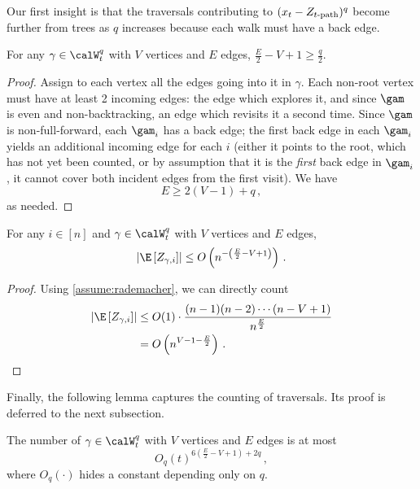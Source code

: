 \documentclass[12pt]{article}
\begin{document}
Our first insight is that the traversals contributing to $(x_t-Z_{t\textnormal{-path}})^q$ become further from trees as $q$ increases because each walk must have a back edge.

\begin{lemma}
    For any $\gamma\in \calW_t^q$ with $V$ vertices and $E$ edges, $\frac E 2 - V + 1\ge \frac q 2$.
\end{lemma}

\begin{proof}
    Assign to each vertex all the edges going into it in $\gamma$.
    Each non-root vertex must have at least 2 incoming edges:
    the edge which explores it, and since $\gam$ is even and non-backtracking,
    an edge which revisits it a second time.
    Since $\gam$ is non-full-forward, each $\gam_i$ has a back edge; the first back edge in each $\gam_i$ yields an additional incoming edge for each $i$ (either it points to the root, which has not yet been counted, or by assumption that it is the \emph{first} back edge in $\gam_i$, it cannot cover both incident edges from the first visit). We have
    \[E \geq 2(V-1) + q\,,\]
    as needed.
\end{proof}

\begin{lemma}\label{lem:walk-magnitude}
    For any $i\in[n]$ and $\gamma\in\calW_t^q$ with $V$ vertices and $E$ edges,
    \[
        \left|\E\left[Z_{\gamma,i}\right]\right|\le O\left(n^{-\left(\frac E 2 - V + 1\right)}\right)\,.
    \]
\end{lemma}

\begin{proof}
    Using \cref{assume:rademacher}, we can directly count
    \begin{align*}
        \left|\E\left[Z_{\gamma,i}\right]\right| &\le O(1)\cdot \frac {(n-1)(n-2)\cdots (n-V+1)} {n^{\frac E 2}}\\
        &= O\left(n^{V-1 - \frac{E} 2}\right)\,.\qedhere
    \end{align*}
\end{proof}

Finally, the following lemma captures the counting of traversals. Its proof is deferred to the next subsection.

\begin{lemma}\label{lem:walk-number}
    The number of $\gamma\in\calW_t^q$ with $V$ vertices and $E$ edges is at most
    \[
        O_q(t)^{6\left(\frac{E}{2} - V+1\right)+2q}\,,
    \]
    where $O_q(\cdot)$ hides a constant depending only on $q$.
\end{lemma}
\end{document}
